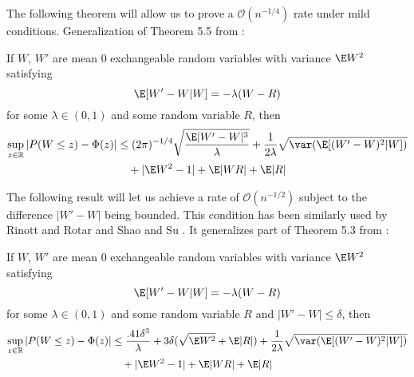 The following theorem will allow us to prove a $\mathcal{O}(n^{-1/4})$ rate under
mild conditions.  Generalization of Theorem 5.5 from \cite{chen2010normal}:
\begin{theorem}
  \label{T:main}
  If $W$, $W'$ are mean 0 exchangeable random variables with variance
  $\E W^2$
  satisfying
  \begin{equation*}
    \label{eq:13}
    \E[W'-W|W] = -\lambda(W-R)
  \end{equation*}
  for some $\lambda \in (0,1)$ and some random variable $R$, then
  \begin{equation*}
    \begin{split}
      \sup_{z \in \mathbb{R}} |P(W \leq z) - \Phi(z)|
      &\leq (2\pi)^{-1/4} \sqrt{\frac{\E |W'-W|^3}{\lambda}}
      + \frac{1}{2\lambda} \sqrt{\var (\E [(W'-W)^2|W])} \\
      &\quad + |\E W^2 - 1| + \E |WR| + \E |R|
    \end{split}
  \end{equation*}
\end{theorem}

The following result will let us achieve a rate of $\mathcal{O}(n^{-1/2})$ subject to
the difference $|W'-W|$ being bounded.  This condition has been similarly used by
Rinott and Rotar \cite{rinott1997coupling} and Shao and Su \cite{shao2006berry}.
It generalizes part of Theorem 5.3 from \cite{chen2010normal}:
\begin{theorem}
  \label{T:better-rate}
  If $W$, $W'$ are mean 0 exchangeable random variables with variance
  $\E W^2$
  satisfying
  \begin{equation*}
    \E[W'-W|W] = -\lambda(W-R)
  \end{equation*}
  for some $\lambda \in (0,1)$ and some random variable $R$ and $|W'-W| \leq \delta$, then
  \begin{equation*}
    \begin{split}
      \sup_{z \in \mathbb{R}} |P(W \leq z) - \Phi(z)|
      &\leq \frac{.41 \delta^3}{\lambda} + 3 \delta (\sqrt{\E W^2} + \E |R|)
      + \frac{1}{2\lambda} \sqrt{\var (\E [(W'-W)^2|W])} \\
      &\quad + |\E W^2 - 1| + \E |WR| + \E |R|
    \end{split}
  \end{equation*}
\end{theorem}
